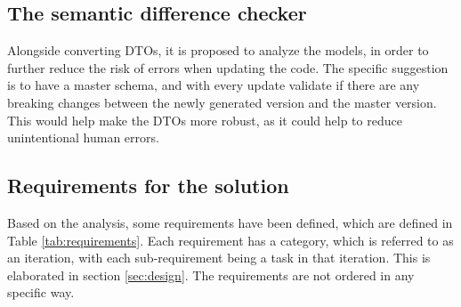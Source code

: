 \subsection{The semantic difference checker}
Alongside converting DTOs, it is proposed to analyze the models, in order to further reduce the risk of errors when updating the code.
The specific suggestion is to have a master schema, and with every update validate if there are any breaking changes between the newly generated version and the master version. This would help make the DTOs more robust, as it could help to reduce unintentional human errors. 


\subsection{Requirements for the solution}
Based on the analysis, some requirements have been defined, which are defined in Table \ref{tab:requirements}.
Each requirement has a category, which is referred to as an iteration, with each sub-requirement being a task in that iteration. This is elaborated in section \ref{sec:design}.
The requirements are not ordered in any specific way.
